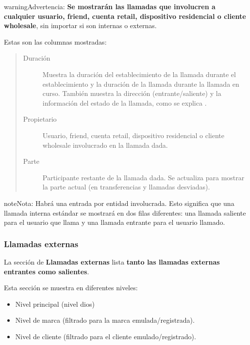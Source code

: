 \documentclass[letterpaper,10pt,spanish]{sphinxmanual}
\begin{document}
\begin{notice}{warning}{Advertencia:}
\textbf{Se mostrarán las llamadas que involucren a cualquier usuario, friend, cuenta retail, dispositivo residencial o cliente wholesale}, sin importar si son internas o externas.
\end{notice}

Estas son las columnas mostradas:
\begin{quote}
\begin{description}
\item[{Duración}] \leavevmode
Muestra la duración del establecimiento de la llamada durante el establecimiento y la duración de la llamada durante la llamada en curso. También muestra la dirección (entrante/saliente) y la información del estado de la llamada, como se explica {\hyperref[administration_portal/platform/active_calls:call\string-state]{}}.

\item[{Propietario}] \leavevmode
Usuario, friend, cuenta retail, dispositivo residencial o cliente wholesale involucrado en la llamada dada.

\item[{Parte}] \leavevmode
Participante restante de la llamada dada. Se actualiza para mostrar la parte actual (en transferencias y llamadas desviadas).

\end{description}
\end{quote}

\begin{notice}{note}{Nota:}
Habrá una entrada por entidad involucrada. Esto significa que una llamada interna estándar se mostrará en dos filas diferentes: una llamada saliente para el usuario que llama y una llamada entrante para el usuario llamado.
\end{notice}


\subsubsection{Llamadas externas}
\label{administration_portal/client/wholesale/calls/external_calls::doc}\label{administration_portal/client/wholesale/calls/external_calls:external-calls}
La sección de \textbf{Llamadas externas} lista \textbf{tanto las llamadas externas entrantes como salientes}.

Esta sección se muestra en diferentes niveles:
\begin{itemize}
\item {} 
Nivel principal (nivel dios)

\item {} 
Nivel de marca (filtrado para la marca emulada/registrada).

\item {} 
Nivel de cliente (filtrado para el cliente emulado/registrado).

\end{itemize}
\end{document}
